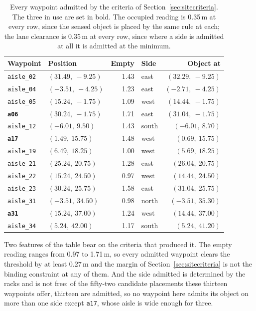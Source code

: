 \documentclass[11pt,a4paper]{article}
\theoremstyle{definition}
\newcommand{\code}[1]{\texttt{\small #1}}
\begin{document}
\begin{table}[H]
\centering\small
\caption{Every waypoint admitted by the criteria of
Section~\ref{sec:sitecriteria}. The three in use are set in bold. The occupied
reading is 0.35\,m at every row, since the sensed object is placed by the same
rule at each; the lane clearance is 0.35\,m at every row, since where a side is
admitted at all it is admitted at the minimum.}
\label{tab:allsites}
\begin{tabular}{@{}llrlr@{}}
\toprule
\textbf{Waypoint} & \textbf{Position} & \textbf{Empty} & \textbf{Side}
  & \textbf{Object at} \\
\midrule
\code{aisle\_02} & $(31.49,\ -9.25)$ & 1.43 & east  & $(32.29,\ -9.25)$ \\
\code{aisle\_04} & $(-3.51,\ -4.25)$ & 1.23 & east  & $(-2.71,\ -4.25)$ \\
\code{aisle\_05} & $(15.24,\ -1.75)$ & 1.09 & west  & $(14.44,\ -1.75)$ \\
\textbf{\code{a06}} & $(30.24,\ -1.75)$ & 1.71 & east & $(31.04,\ -1.75)$ \\
\code{aisle\_12} & $(-6.01,\ 9.50)$  & 1.43 & south & $(-6.01,\ 8.70)$ \\
\textbf{\code{a17}} & $(1.49,\ 15.75)$ & 1.48 & west & $(0.69,\ 15.75)$ \\
\code{aisle\_19} & $(6.49,\ 18.25)$  & 1.00 & west  & $(5.69,\ 18.25)$ \\
\code{aisle\_21} & $(25.24,\ 20.75)$ & 1.28 & east  & $(26.04,\ 20.75)$ \\
\code{aisle\_22} & $(15.24,\ 24.50)$ & 0.97 & west  & $(14.44,\ 24.50)$ \\
\code{aisle\_23} & $(30.24,\ 25.75)$ & 1.58 & east  & $(31.04,\ 25.75)$ \\
\code{aisle\_31} & $(-3.51,\ 34.50)$ & 0.98 & north & $(-3.51,\ 35.30)$ \\
\textbf{\code{a31}} & $(15.24,\ 37.00)$ & 1.24 & west & $(14.44,\ 37.00)$ \\
\code{aisle\_34} & $(5.24,\ 42.00)$  & 1.17 & south & $(5.24,\ 41.20)$ \\
\bottomrule
\end{tabular}
\end{table}

Two features of the table bear on the criteria that produced it. The empty
reading ranges from 0.97 to 1.71\,m, so every admitted waypoint clears the
threshold by at least $0.27$\,m and the margin of Section~\ref{sec:sitecriteria}
is not the binding constraint at any of them. And the side admitted is
determined by the racks and is not free: of the fifty-two candidate placements
these thirteen waypoints offer, thirteen are admitted, so no waypoint here
admits its object on more than one side except \code{a17}, whose aisle is
wide enough for three.
\end{document}
